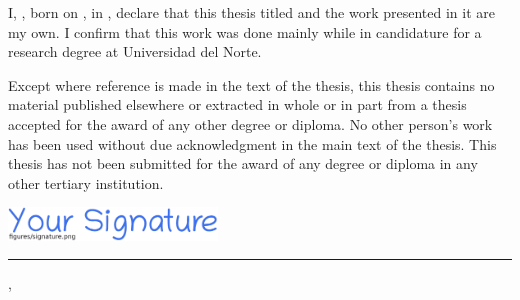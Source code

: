 
\noindent I, {\myFirstName} {\myLastName}, born on {\myBirthMonth} {\myBirthDay}, {\myBirthYear} in {\myBirthPlace}, declare that this thesis titled \emph{\myTitle} and the work presented in it are my own. I confirm that this work was done mainly while in candidature for a research degree at Universidad del Norte.

Except where reference is made in the text of the thesis, this thesis contains no material published elsewhere or extracted in whole or in part from a thesis accepted for the award of any other degree or diploma. No other person's work has been used without due acknowledgment in the main text of the thesis. This thesis has not been submitted for the award of any degree or diploma in any other tertiary institution.

\vspace{5em}


\noindent\hspace{0.5em}\includegraphics[width=15em]{figures/signature}\\
\noindent\rule[1em]{16.5em}{0.5pt}

\vspace{-1.5em}
\noindent {\myFirstName} {\myLastName} \hspace{12em} {\mySubmissionMonth} {\mySubmissionDay}, {\mySubmissionYear}
